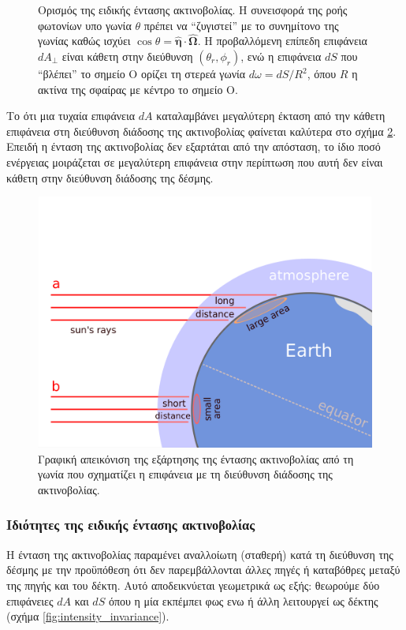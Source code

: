 \begin{figure}[h]
\begin{subfigure}[h]{0.5\textwidth}
    \end{subfigure}
    \caption{Ορισμός της ειδικής έντασης ακτινοβολίας. Η συνεισφορά της ροής φωτονίων υπο γωνία $\theta$ πρέπει να ``ζυγιστεί'' με το συνημίτονο της γωνίας καθώς ισχύει $\cos \theta = \boldsymbol{\hat{\eta}} \cdot \boldsymbol{\hat{\Omega}}$. Η προβαλλόμενη επίπεδη επιφάνεια $dA_{\perp}$ είναι κάθετη στην διεύθυνση $(\theta_r, \phi_r)$, ενώ η επιφάνεια $dS$ που ``βλέπει'' το σημείο Ο ορίζει τη στερεά γωνία $d \omega = dS/R^2$, όπου $R$ η ακτίνα της σφαίρας με κέντρο το σημείο Ο.}
    \label{fig:intensity_definition}
\end{figure}

Το ότι μια τυχαία επιφάνεια $dA$ καταλαμβάνει μεγαλύτερη έκταση από την κάθετη επιφάνεια στη διεύθυνση διάδοσης της ακτινοβολίας φαίνεται καλύτερα στο σχήμα \ref{fig:oblique_rays}. Επειδή η ένταση της ακτινοβολίας δεν εξαρτάται από την απόσταση, το ίδιο ποσό ενέργειας μοιράζεται σε μεγαλύτερη επιφάνεια στην περίπτωση που αυτή δεν είναι κάθετη στην διεύθυνση διάδοσης της δέσμης.

\begin{figure}[h]
    \centering
    \includegraphics[scale=0.15]{Figures/oblique_rays.png}
    \caption{Γραφική απεικόνιση της εξάρτησης της έντασης ακτινοβολίας από τη γωνία που σχηματίζει η επιφάνεια με τη διεύθυνση διάδοσης της ακτινοβολίας.}
    \label{fig:oblique_rays}
\end{figure}



\subsubsection{Ιδιότητες της ειδικής έντασης ακτινοβολίας}
Η ένταση της ακτινοβολίας παραμένει αναλλοίωτη (σταθερή) κατά τη διεύθυνση της δέσμης με την προϋπόθεση ότι δεν παρεμβάλλονται άλλες πηγές ή καταβόθρες μεταξύ της πηγής και του δέκτη. Αυτό αποδεικνύεται γεωμετρικά ως εξής: θεωρούμε δύο επιφάνειες $dA$ και $dS$ όπου η μία εκπέμπει φως ενω ή άλλη λειτουργεί ως δέκτης (σχήμα \ref{fig:intensity_invariance}).

